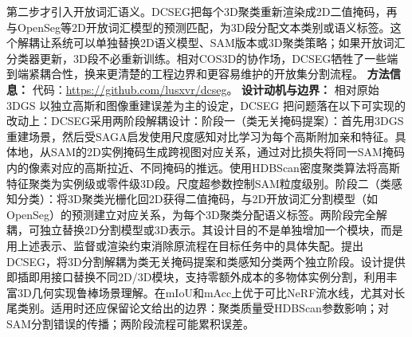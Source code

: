 第二步才引入开放词汇语义。DCSEG把每个3D聚类重新渲染成2D二值掩码，再与OpenSeg等2D开放词汇模型的预测匹配，为3D段分配文本类别或语义标签。这个解耦让系统可以单独替换2D语义模型、SAM版本或3D聚类策略；如果开放词汇分类器更新，3D段不必重新训练。相对COS3D的协作场，DCSEG牺牲了一些端到端紧耦合性，换来更清楚的工程边界和更容易维护的开放集分割流程。
\textbf{方法信息：} 代码：\url{https://github.com/lusxvr/dcseg}。
\textbf{设计动机与边界：} 相对原始 3DGS 以独立高斯和图像重建误差为主的设定，DCSEG 把问题落在以下可实现的改动上：DCSEG采用两阶段解耦设计：阶段一（类无关掩码提案）：首先用3DGS重建场景，然后受SAGA启发使用尺度感知对比学习为每个高斯附加亲和特征。具体地，从SAM的2D实例掩码生成跨视图对应关系，通过对比损失将同一SAM掩码内的像素对应的高斯拉近、不同掩码的推远。使用HDBScan密度聚类算法将高斯特征聚类为实例级或零件级3D段。尺度超参数控制SAM粒度级别。阶段二（类感知分类）：将3D聚类光栅化回2D获得二值掩码，与2D开放词汇分割模型（如OpenSeg）的预测建立对应关系，为每个3D聚类分配语义标签。两阶段完全解耦，可独立替换2D分割模型或3D表示。其设计目的不是单独增加一个模块，而是用上述表示、监督或渲染约束消除原流程在目标任务中的具体失配。提出DCSEG，将3D分割解耦为类无关掩码提案和类感知分类两个独立阶段。设计提供即插即用接口替换不同2D/3D模块，支持零额外成本的多物体实例分割，利用丰富3D几何实现鲁棒场景理解。在mIoU和mAcc上优于可比NeRF流水线，尤其对长尾类别。适用时还应保留论文给出的边界：聚类质量受HDBScan参数影响；对SAM分割错误的传播；两阶段流程可能累积误差。
